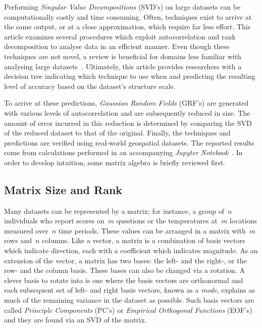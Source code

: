 \documentclass[ijgi,article,submit,moreauthors,pdftex,10pt,a4paper]{Definitions/mdpi}
\begin{document}
Performing \textit{Singular Value Decompositions} (SVD's) on large datasets can be computationally costly and time consuming. Often, techniques exist to arrive at the same output, or at a close approximation, which require far less effort. This article examines several procedures which exploit autocorrelation and rank decomposition to analyse data in an efficient manner. Even though these techniques are not novel, a review is beneficial for domains less familiar with analysing large datasets~\cite{Golub1970, Bjorck1973, Chan1982}. Ultimately, this article provides researchers with a decision tree indicating which technique to use when and predicting the resulting level of accuracy based on the dataset's structure scale.

To arrive at these predictions, \textit{Gaussian Random Fields} (GRF's) are generated with various levels of autocorrelation and are subsequently reduced in size. The amount of error incurred in this reduction is determined by comparing the SVD of the reduced dataset to that of the original. Finally, the techniques and predictions are verified using real-world geospatial datasets. The reported results come from calculations performed in an accompanying \textit{Jupyter Notebook}~\cite{Bogaardt2018}. In order to develop intuition, some matrix algebra is briefly reviewed first.

\subsection{Matrix Size and Rank}
\label{sec:Introduction/Matrix Size and Rank}

Many datasets can be represented by a matrix; for instance, a group of~$n$ individuals who report scores on~$m$ questions or the temperatures at~$m$ locations measured over~$n$ time periods. These values can be arranged in a matrix with~$m$ rows and~$n$ columns. Like a vector, a matrix is a combination of basis vectors which indicate direction, each with a coefficient which indicates magnitude. As an extension of the vector, a matrix has two bases: the left- and the right-, or the row- and the column basis. These bases can also be changed via a rotation. A clever basis to rotate into is one where the basis vectors are orthonormal and each subsequent set of left- and right basis vectors, known as a \textit{mode}, explains as much of the remaining variance in the dataset as possible. Such basis vectors are called \textit{Principle Components} (PC's) or \textit{Empirical Orthogonal Functions} (EOF's) and they are found via an SVD of the matrix.
\end{document}
